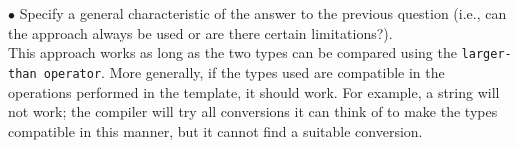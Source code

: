 $\bullet$ Specify a general characteristic of the answer to the previous question (i.e., can the approach always be used or are there certain limitations?). \\
This approach works as long as the two types can be compared using the \texttt{larger-than operator}. More generally, if the types used are compatible in the operations performed in the template, it should work. For example, a string will not work; the compiler will try all conversions it can think of to make the types compatible in this manner, but it cannot find a suitable conversion.
